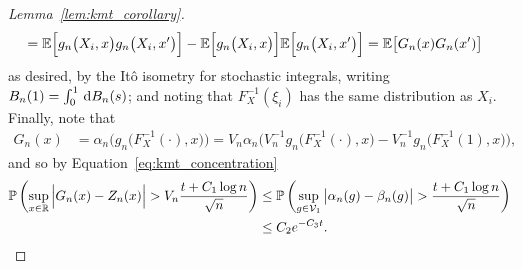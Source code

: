 \begin{proof}[Lemma~\ref{lem:kmt_corollary}]
\begin{align*}
    &=
    \mathbb{E}\Big[
      g_n\big(X_i, x\big)
      g_n\big(X_i, x'\big)
    \Big]
    - \mathbb{E}\Big[
      g_n\big(X_i, x\big)
    \Big]
    \mathbb{E}\Big[
      g_n\big(X_i, x'\big)
    \Big]
    =
    \mathbb{E}\big[
      G_n(x)
      G_n(x')
    \big]
  \end{align*}
  as desired, by the It\^o isometry for stochastic integrals,
  writing $B_n(1) = \int_0^1 \,\mathrm{d}B_n(s)$;
  and noting that $F_X^{-1}(\xi_i)$
  has the same distribution as $X_i$.
  Finally, note that
  \begin{align*}
    G_n(x)
    &=
    \alpha_n \Big(g_n\big(F_X^{-1}(\cdot), x\big)\Big)
    = V_n \alpha_n \Big(
      V_n^{-1} g_n\big(F_X^{-1}(\cdot), x\big)
      - V_n^{-1} g_n\big(F_X^{-1}(1), x\big)
    \Big),
  \end{align*}
  and so by Equation~\ref{eq:kmt_concentration}
  \begin{align*}
    \mathbb{P}\left(
      \sup_{x \in \mathbb{R}}
      \Big|G_n(x) - Z_n(x)\Big|
      > V_n \frac{t + C_1 \log n}{\sqrt n}
    \right)
    &\leq
    \mathbb{P}\left(
      \sup_{g \in \mathcal{V}_1}
      \big|\alpha_n(g) - \beta_n(g)\big|
      > \frac{t + C_1\log n}{\sqrt{n}}
    \right) \\
    &\leq C_2 e^{-C_3 t}.
  \end{align*}
\end{proof}

